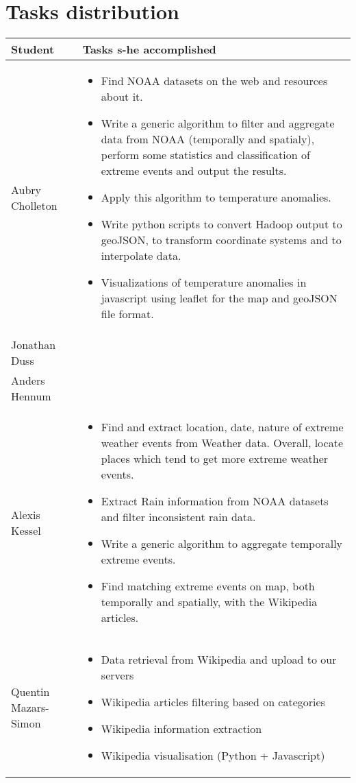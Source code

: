 \section{Tasks distribution}
\begin{tabular}{|l|p{10.5cm}|}
\hline
\textbf{Student} & \textbf{Tasks s-he accomplished} \\
\hline
Aubry Cholleton & \begin{itemize}
	\item Find NOAA datasets on the web and resources about it.
	\item Write a generic algorithm to filter and aggregate data from NOAA (temporally and spatialy), perform some statistics and classification of extreme events and output the results.
	\item Apply this algorithm to temperature anomalies.
	\item Write python scripts to convert Hadoop output to geoJSON, to transform coordinate systems and to interpolate data.
	\item Visualizations of temperature anomalies in javascript using leaflet for the map and geoJSON file format.
\end{itemize}\\
\hline
Jonathan Duss & \\
\hline
Anders Hennum & \\
\hline
Alexis Kessel & \begin{itemize}
	\item Find and extract location, date, nature of extreme weather events from Weather data. Overall, locate places which tend to get more extreme weather events.
	\item Extract Rain information from NOAA datasets and filter inconsistent rain data.
	\item Write a generic algorithm to aggregate temporally extreme events.
	\item Find matching extreme events on map, both temporally and spatially, with the Wikipedia articles.
\end{itemize}\\
\hline
Quentin Mazars-Simon & \begin{itemize}
	\item Data retrieval from Wikipedia and upload to our servers
	\item Wikipedia articles filtering based on categories
	\item Wikipedia information extraction
	\item Wikipedia visualisation (Python + Javascript)

\end{itemize}
\end{tabular}
